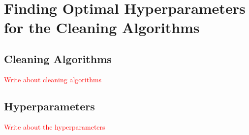 \chapter{Finding Optimal Hyperparameters for the Cleaning Algorithms}
\label{ch:finding-hyperparams}

\section{Cleaning Algorithms}
\label{sec:cleaning-algorithms}
\textcolor{red}{Write about cleaning algorithms}

\section{Hyperparameters}
\label{sec:hyperparameters}
\textcolor{red}{Write about the hyperparameters}
